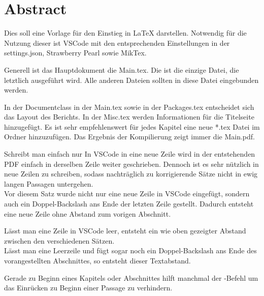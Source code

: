 \chapter*{Abstract}
Dies soll eine Vorlage für den Einstieg in LaTeX darstellen.
Notwendig für die Nutzung dieser ist VSCode mit den entsprechenden Einstellungen in der settings.json, Strawberry Pearl sowie MikTex.

Generell ist das Hauptdokument die Main.tex. Die ist die einzige Datei, die letztlich ausgeführt wird. Alle anderen Dateien sollten in diese Datei eingebunden werden.

In der Documentclass in der Main.tex sowie in der Packages.tex entscheidet sich das Layout des Berichts. In der Misc.tex werden Informationen für die Titelseite hinzugefügt.
Es ist sehr empfehlenswert für jedes Kapitel eine neue *.tex Datei im Ordner  hinzuzufügen. Das Ergebnis der Kompilierung zeigt immer die Main.pdf.

Schreibt man einfach nur In VSCode in eine neue Zeile wird in der entstehenden PDF einfach in derselben Zeile weiter geschrieben.
Dennoch ist es sehr nützlich in neue Zeilen zu schreiben, sodass nachträglich zu korrigierende Sätze nicht in ewig langen Passagen untergehen. \\
Vor diesem Satz wurde nicht nur eine neue Zeile in VSCode eingefügt, sondern auch ein Doppel-Backslash \gans{\textbackslash\textbackslash} ans Ende der letzten Zeile gestellt. Dadurch entsteht eine neue Zeile ohne Abstand zum vorigen Abschnitt.

Lässt man eine Zeile in VSCode leer, entsteht ein wie oben gezeigter Abstand zwischen den verschiedenen Sätzen.\\

Lässt man eine Leerzeile und fügt sogar noch ein Doppel-Backslash \gans{\textbackslash\textbackslash} ans Ende des vorangestellten Abschnittes, so entsteht dieser Textabstand.

Gerade zu Beginn eines Kapitels oder Abschnittes hilft manchmal der -Befehl um das Einrücken zu Beginn einer Passage zu verhindern.
